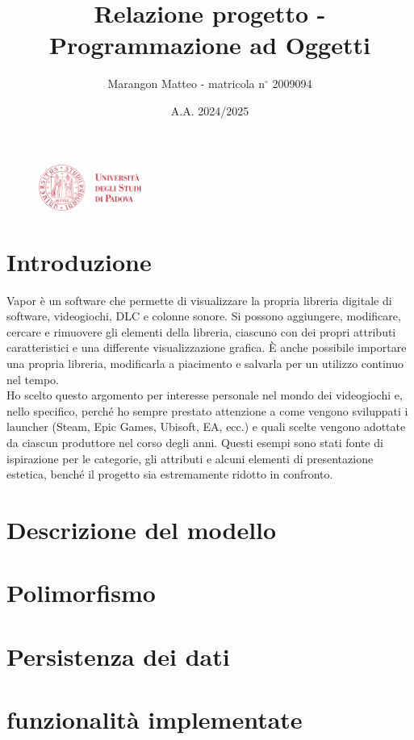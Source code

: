 \documentclass[10pt]{article}
\title{Relazione progetto - Programmazione ad Oggetti}
\author{Marangon Matteo - matricola n$^{\circ}$ 2009094}
\date{A.A. 2024/2025}
\begin{document}
\begin{figure}
    \centering
    \includegraphics[width=0.3\textwidth]{./unipdlogo.png}
\end{figure}
\maketitle

\newpage

\tableofcontents  %
\newpage

\section{Introduzione} %
Vapor è un software che permette di visualizzare la propria libreria digitale di software, videogiochi, DLC e colonne sonore. Si possono aggiungere, modificare, cercare e rimuovere gli elementi della libreria, ciascuno con dei propri attributi caratteristici e una differente visualizzazione grafica. È anche possibile importare una propria libreria, modificarla a piacimento e salvarla per un utilizzo continuo nel tempo.
\\Ho scelto questo argomento per interesse personale nel mondo dei videogiochi e, nello specifico, perché ho sempre prestato attenzione a come vengono sviluppati i launcher (Steam, Epic Games, Ubisoft, EA, ecc.) e quali scelte vengono adottate da ciascun produttore nel corso degli anni. Questi esempi sono stati fonte di ispirazione per le categorie, gli attributi e alcuni elementi di presentazione estetica, benché il progetto sia estremamente ridotto in confronto.
\section{Descrizione del modello}
\section{Polimorfismo}
\section{Persistenza dei dati}
\section{funzionalità implementate}
\end{document}
